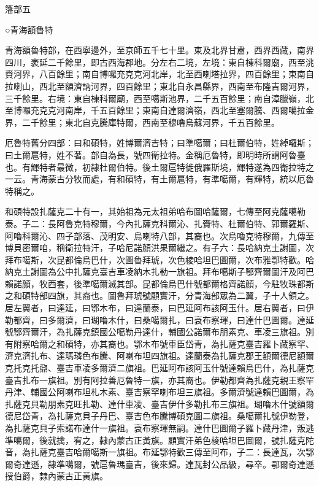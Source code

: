 
\begin{pinyinscope}
籓部五

○青海額魯特

青海額魯特部，在西寧邊外，至京師五千七十里。東及北界甘肅，西界西藏，南界四川，袤延二千餘里，即古西海郡地。分左右二境，左境：東自棟科爾廟，西至洮賚河界，八百餘里；南自博囉充克克河北岸，北至西喇塔拉界，四百餘里；東南自拉喇山，西北至額濟訥河界，四百餘里；東北自永昌縣界，西南至布隆吉爾河界，三千餘里。右境：東自棟科爾廟，西至噶斯池界，二千五百餘里；南自漳臘嶺，北至博囉充克克河南岸，千五百餘里；東南自達爾濟嶺，西北至塞爾騰、西爾噶拉金界，二千餘里；東北自克騰庫特爾，西南至穆嚕烏蘇河界，千五百餘里。

厄魯特舊分四部：曰和碩特，姓博爾濟吉特；曰準噶爾；曰杜爾伯特，姓綽囉斯；曰土爾扈特，姓不著。部自為長，號四衛拉特。金稱厄魯特，即明時所謂阿魯臺也。有輝特者最微，初隸杜爾伯特。後土爾扈特徙俄羅斯境，輝特遂為四衛拉特之一云。青海蒙古分牧而處，有和碩特，有土爾扈特，有準噶爾，有輝特，統以厄魯特稱之。

和碩特設扎薩克二十有一，其始祖為元太祖弟哈布圖哈薩爾，七傳至阿克薩噶勒泰。子二：長阿魯克特穆爾，今內扎薩克科爾沁、扎賚特、杜爾伯特、郭爾羅斯、阿嚕科爾沁、四子部落、茂明安、烏喇特八部，其裔也。次烏嚕克特穆爾，九傳至博貝密爾咱，稱衛拉特汗，子哈尼諾顏洪果爾繼之。有子六：長哈納克土謝圖，次拜布噶斯，次昆都倫烏巴什，次圖魯拜琥，次色棱哈坦巴圖爾，次布雅鄂特歡。哈納克土謝圖為公中扎薩克臺吉車凌納木扎勒一旗祖。拜布噶斯子鄂齊爾圖汗及阿巴賴諾顏，牧西套，後準噶爾滅其部。昆都倫烏巴什號都爾格齊諾顏，今駐牧珠都斯之和碩特部四旗，其裔也。圖魯拜琥號顧實汗，分青海部眾為二翼，子十人領之。居左翼者，曰達延，曰鄂木布，曰達蘭泰，曰巴延阿布該阿玉什。居右翼者，曰伊勒都齊，曰多爾濟，曰瑚嚕木什，曰桑噶爾扎，曰袞布察琿，曰達什巴圖爾。達延號鄂齊爾汗，為扎薩克鎮國公噶勒丹達什，輔國公諾爾布朋素克、車凌三旗祖。別有附察哈爾之和碩特，亦其裔也。鄂木布號車臣岱青，為扎薩克臺吉羅卜藏察罕、濟克濟扎布、達瑪璘色布騰、阿喇布坦四旗祖。達蘭泰為扎薩克郡王額爾德尼額爾克托克托鼐、臺吉車凌多爾濟二旗祖。巴延阿布該阿玉什號達賴烏巴什，為扎薩克臺吉扎布一旗祖。別有阿拉善厄魯特一旗，亦其裔也。伊勒都齊為扎薩克親王察罕丹津、輔國公阿喇布坦札木素、臺吉察罕喇布坦三旗祖。多爾濟號達賴巴圖爾，為扎薩克貝勒朋素克旺扎勒、達什車凌、臺吉伊什多勒扎布三旗祖。瑚嚕木什號額爾德尼岱青，為扎薩克貝子丹巴、臺吉色布騰博碩克圖二旗祖。桑噶爾扎號伊勒登，為扎薩克貝子索諾布達什一旗祖。袞布察琿無嗣。達什巴圖爾子羅卜藏丹津，叛逃準噶爾，後就擒，宥之，隸內蒙古正黃旗。顧實汗弟色棱哈坦巴圖爾，號扎薩克陀音，為扎薩克臺吉哈爾噶斯一旗祖。布延鄂特歡三傳至阿布，子二：長達瓦，次鄂爾奇達遜，隸準噶爾，號扈魯瑪臺吉，後來歸。達瓦封公品級，尋卒。鄂爾奇達遜授伯爵，隸內蒙古正黃旗。


\end{pinyinscope}
